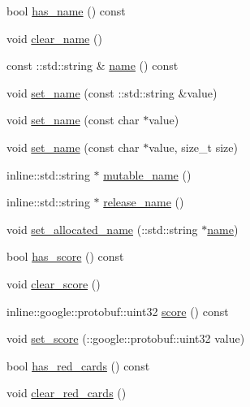 \begin{DoxyCompactItemize}
\item 
bool \hyperlink{class_s_s_l___referee___team_info_a965b5db74cfbf0f462fdbfdc73641962}{has\-\_\-name} () const 
\item 
void \hyperlink{class_s_s_l___referee___team_info_a7ec2058f79237061320b91f952a748e4}{clear\-\_\-name} ()
\item 
const \-::std\-::string \& \hyperlink{class_s_s_l___referee___team_info_a43a2a401a354256e53c786308e75739a}{name} () const 
\item 
void \hyperlink{class_s_s_l___referee___team_info_a62f00af1da5471ac244b680e86ad982d}{set\-\_\-name} (const \-::std\-::string \&value)
\item 
void \hyperlink{class_s_s_l___referee___team_info_a56ecb0f113f7d3551ca6fca41a941427}{set\-\_\-name} (const char $\ast$value)
\item 
void \hyperlink{class_s_s_l___referee___team_info_a8fd47da8319a67fa28b8d2e0a705e2f2}{set\-\_\-name} (const char $\ast$value, size\-\_\-t size)
\item 
inline\-::std\-::string $\ast$ \hyperlink{class_s_s_l___referee___team_info_a2c491dee07e8fcd64c34d5c8bd66af7e}{mutable\-\_\-name} ()
\item 
inline\-::std\-::string $\ast$ \hyperlink{class_s_s_l___referee___team_info_ab19c4814de5dede40dcf6fe554ad91aa}{release\-\_\-name} ()
\item 
void \hyperlink{class_s_s_l___referee___team_info_a836df412319c538f847aa046b873c516}{set\-\_\-allocated\-\_\-name} (\-::std\-::string $\ast$\hyperlink{class_s_s_l___referee___team_info_a43a2a401a354256e53c786308e75739a}{name})
\item 
bool \hyperlink{class_s_s_l___referee___team_info_ac161942a845d967a69bb27c3933b0623}{has\-\_\-score} () const 
\item 
void \hyperlink{class_s_s_l___referee___team_info_abb0e7f1988fb0b6d528baca3f12a0bac}{clear\-\_\-score} ()
\item 
inline\-::google\-::protobuf\-::uint32 \hyperlink{class_s_s_l___referee___team_info_a7fafe728b28bba318b19fea232eb409c}{score} () const 
\item 
void \hyperlink{class_s_s_l___referee___team_info_a8f9bfe1074e1f03f747c53ab8d72ccf5}{set\-\_\-score} (\-::google\-::protobuf\-::uint32 value)
\item 
bool \hyperlink{class_s_s_l___referee___team_info_ada783824be126c5a73356198461f8910}{has\-\_\-red\-\_\-cards} () const 
\item 
void \hyperlink{class_s_s_l___referee___team_info_a3c8256793c9f2eb65b2ab8a822cc8dee}{clear\-\_\-red\-\_\-cards} ()

\end{DoxyCompactItemize}
